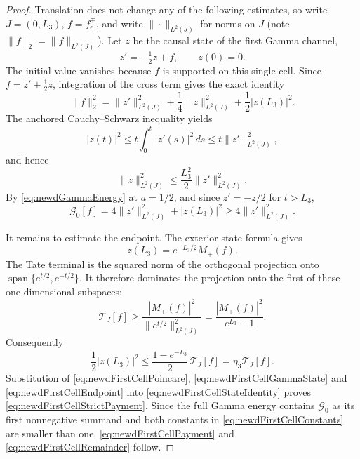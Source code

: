 \documentclass[11pt]{amsart}
\theoremstyle{definition}
\theoremstyle{remark}
\begin{document}
\begin{proof}
Translation does not change any of the following estimates, so write
$J=(0,L_3)$, $f=f_e^{\mp}$, and write $\|\cdot\|_{L^2(J)}$ for norms on $J$
(note $\|f\|_2=\|f\|_{L^2(J)}$).  Let $z$ be the causal state of the first Gamma channel,
\[
 z'=-\tfrac12z+f,
 \qquad z(0)=0.
\]
The initial value vanishes because $f$ is supported on this single cell.
Since $f=z'+\tfrac12z$, integration of the cross term gives the exact
identity
\begin{equation}\label{eq:newdFirstCellStateIdentity}
 \|f\|_2^2
 =\|z'\|_{L^2(J)}^2+\frac14\|z\|_{L^2(J)}^2+\frac12|z(L_3)|^2.
\end{equation}
The anchored Cauchy--Schwarz inequality yields
\[
 |z(t)|^2
 \leq t\int_0^t|z'(s)|^2\,ds
 \leq t\|z'\|_{L^2(J)}^2,
\]
and hence
\begin{equation}\label{eq:newdFirstCellPoincare}
 \|z\|_{L^2(J)}^2\leq\frac{L_3^2}{2}\|z'\|_{L^2(J)}^2.
\end{equation}
By \eqref{eq:newdGammaEnergy} at $a=1/2$, and since $z'=-z/2$ for
$t>L_3$,
\begin{equation}\label{eq:newdFirstCellGammaState}
 \mathcal G_0[f]=4\|z'\|_{L^2(J)}^2+|z(L_3)|^2\geq4\|z'\|_{L^2(J)}^2.
\end{equation}

It remains to estimate the endpoint.  The exterior-state formula gives
\[
 z(L_3)=e^{-L_3/2}M_+(f).
\]
The Tate terminal is the squared norm of the orthogonal projection onto
$\operatorname{span}\{e^{t/2},e^{-t/2}\}$.  It therefore dominates the
projection onto the first of these one-dimensional subspaces:
\begin{equation}\label{eq:newdFirstCellTateProjection}
 \mathcal T_{J}[f]
 \geq\frac{|M_+(f)|^2}{\|e^{t/2}\|_{L^2(J)}^2}
 =\frac{|M_+(f)|^2}{e^{L_3}-1}.
\end{equation}
Consequently
\begin{equation}\label{eq:newdFirstCellEndpoint}
 \frac12|z(L_3)|^2
 \leq\frac{1-e^{-L_3}}2\,\mathcal T_{J}[f]
 =\eta_3\mathcal T_{J}[f].
\end{equation}
Substitution of \eqref{eq:newdFirstCellPoincare},
\eqref{eq:newdFirstCellGammaState} and
\eqref{eq:newdFirstCellEndpoint} into
\eqref{eq:newdFirstCellStateIdentity} proves
\eqref{eq:newdFirstCellStrictPayment}.  Since the full Gamma energy contains
$\mathcal G_0$ as its first nonnegative summand and both constants in
\eqref{eq:newdFirstCellConstants} are smaller than one,
\eqref{eq:newdFirstCellPayment} and
\eqref{eq:newdFirstCellRemainder} follow.
\end{proof}
\end{document}
